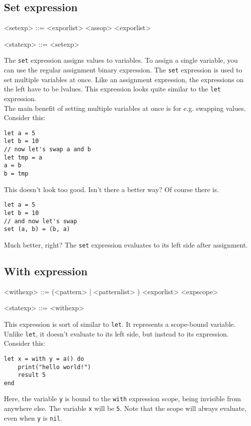 \documentclass{article}
\newenvironment{bnf}
{
\begin{mdframed}
\begin{grammar}
}
{
\end{grammar}
\end{mdframed}
}
\begin{document}
\subsection{Set expression}
\begin{bnf}
<setexp> ::=  <exporlist> <assop> <exporlist>

<statexp> ::= <setexp>
\end{bnf}
The \verb|set| expression assigns values to variables. To assign a single
variable, you can use the regular assignment binary expression. The \verb|set|
expression is used to set multiple variables at once. Like an assignment
expression, the expressions on the left have to be lvalues. This expression
looks quite similar to the \verb|let| expression.\\
The main benefit of setting multiple variables at once is for e.g. swapping
values. Consider this:
\begin{lstlisting}[language=vortex]
let a = 5
let b = 10
// now let's swap a and b
let tmp = a
a = b
b = tmp
\end{lstlisting}
This doesn't look too good. Isn't there a better way? Of course there is.
\begin{lstlisting}[language=vortex]
let a = 5
let b = 10
// and now let's swap
set (a, b) = (b, a)
\end{lstlisting}
Much better, right? The \verb|set| expression evaluates to its left side
after assignment.
\subsection{With expression}
\begin{bnf}
<withexp> ::=  (<pattern> | \lit{(} <patternlist> \lit{)})
    \lit{=} <exporlist> <expscope>

<statexp> ::= <withexp>
\end{bnf}
This expression is sort of similar to \verb|let|. It represents a scope-bound
variable. Unlike \verb|let|, it doesn't evaluate to its left side, but instead
to its expression. Consider this:
\begin{lstlisting}[language=vortex]
let x = with y = a() do
    print("hello world!")
    result 5
end
\end{lstlisting}
Here, the variable \verb|y| is bound to the \verb|with| expression scope, being
invisible from anywhere else. The variable \verb|x| will be \verb|5|. Note that
the scope will always evaluate, even when \verb|y| is \verb|nil|.
\end{document}
